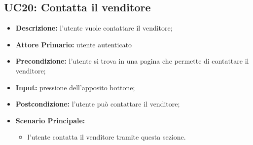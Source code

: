 \subsection{UC20: Contatta il venditore}
\label{sec:UC20}
\begin{itemize}
    \item \textbf{Descrizione:} l'utente vuole contattare il venditore;
    \item \textbf{Attore Primario:} utente autenticato
    \item \textbf{Precondizione:} l'utente si trova in una pagina che permette di contattare il venditore;
    \item \textbf{Input:} pressione dell'apposito bottone;
    \item \textbf{Postcondizione:} l'utente può contattare il venditore;
    \item \textbf{Scenario Principale:}
          \begin{itemize}
              \item l'utente contatta il venditore tramite questa sezione.
          \end{itemize}
\end{itemize}